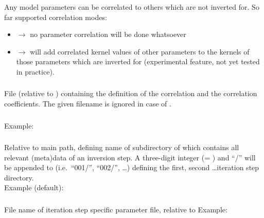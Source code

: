 \subsubsection{} \label{files,sec:main_parfile,itm:par_cor_mode}
Any model parameters can be correlated to others which are not inverted for. So far supported correlation modes:
\begin{itemize}
\item[]  $\rightarrow$ no parameter correlation will be done whatsoever
\item[]  $\rightarrow$ will add correlated kernel values of other parameters to the kernels
  of those parameters which are inverted for (experimental feature, not yet tested in practice).
\end{itemize}
\subsubsection{} \label{files,sec:main_parfile,itm:par_cor_file}
File (relative to ) containing the definition of the correlation and the correlation coefficients. 
The given filename is ignored in case of .
\subsubsection{} \label{files,sec:main_parfile,itm:cur_iter_step}
Example: 
\subsubsection{} \label{files,sec:main_parfile,itm:iter_path}
Relative to main path, defining name of subdirectory of  which contains 
all relevant (meta)data of an inversion step. A three-digit integer (= ) 
and ``/'' will be appended to  (i.e.\ ``001/'', ``002/'', \dots) defining the 
first, second \dots iteration step directory.\\
Example (default): 
\subsubsection{} \label{files,sec:main_parfile,itm:iter_parfile}
File name of iteration step specific parameter file, relative to 
Example: 
